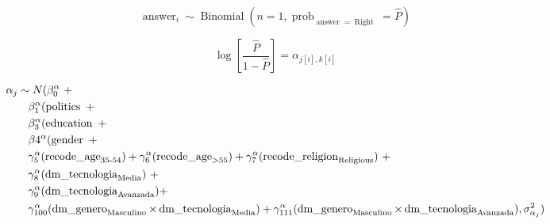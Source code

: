 \documentclass{article}
\begin{document}

\begin{equation}
  \operatorname{answer}_{i}  \sim \operatorname{Binomial}(n = 1, \operatorname{prob}_{\operatorname{answer} = \operatorname{Right}} = \widehat{P})
\end{equation}

\begin{equation}
    \log\left[\frac{\hat{P}}{1 - \hat{P}} \right] =\alpha_{j[i],k[i]}
\end{equation}

\begin{equation}
    \begin{split}
    \MoveEqLeft
    \alpha_{j}  \sim N (\beta_{0}^{\alpha}\ + \\
    & \beta_{1}^{\alpha}(\operatorname{politics}\ + \\
    & \beta_{3}^{\alpha}(\operatorname{education}\ + \\
    & \beta{4}^{\alpha}(\operatorname{gender}\ + \\
    & \gamma_{5}^{\alpha}(\operatorname{recode\_age}_{\operatorname{35-54}}) + \gamma_{6}^{\alpha}(\operatorname{recode\_age}_{\operatorname{>55}}) + \gamma_{7}^{\alpha}(\operatorname{recode\_religion}_{\operatorname{Religious}})\ + \\
    & \gamma_{8}^{\alpha}(\operatorname{dm\_tecnologia}_{\operatorname{Media}})\ + \\
    & \gamma_{9}^{\alpha}(\operatorname{dm\_tecnologia}_{\operatorname{Avanzada}}) + \\
    & \gamma_{100}^{\alpha}(\operatorname{dm\_genero}_{\operatorname{Masculino}} \times \operatorname{dm\_tecnologia}_{\operatorname{Media}}) + \gamma_{111}^{\alpha}(\operatorname{dm\_genero}_{\operatorname{Masculino}} \times \operatorname{dm\_tecnologia}_{\operatorname{Avanzada}}), \sigma^2_{\alpha_{j}})
    \end{split}
\end{equation}
\end{document}
